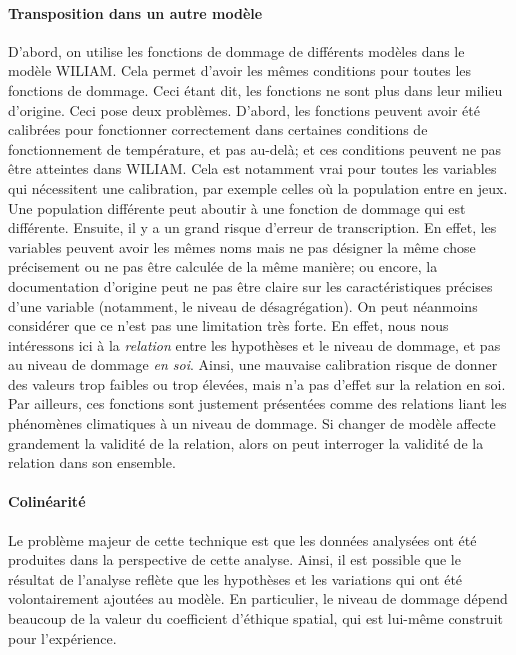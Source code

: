 \paragraph{Transposition dans un autre modèle} D'abord, on utilise les fonctions de dommage de différents modèles dans le modèle WILIAM. Cela permet d'avoir les mêmes conditions pour toutes les fonctions de dommage. Ceci étant dit, les fonctions ne sont plus dans leur milieu d'origine. Ceci pose deux problèmes. D'abord, les fonctions peuvent avoir été calibrées pour fonctionner correctement dans certaines conditions de fonctionnement de température, et pas au-delà; et ces conditions peuvent ne pas être atteintes dans WILIAM. Cela est notamment vrai pour toutes les variables qui nécessitent une calibration, par exemple celles où la population entre en jeux. Une population différente peut aboutir à une fonction de dommage qui est différente. Ensuite, il y a un grand risque d'erreur de transcription. En effet, les variables peuvent avoir les mêmes noms mais ne pas désigner la même chose précisement ou ne pas être calculée de la même manière; ou encore, la documentation d'origine peut ne pas être claire sur les caractéristiques précises d'une variable (notamment, le niveau de désagrégation). On peut néanmoins considérer que ce n'est pas une limitation très forte. En effet, nous nous intéressons ici à la \emph{relation} entre les hypothèses et le niveau de dommage, et pas au niveau de dommage \emph{en soi}. Ainsi, une mauvaise calibration risque de donner des valeurs trop faibles ou trop élevées, mais n'a pas d'effet sur la relation en soi. Par ailleurs, ces fonctions sont justement présentées comme des relations liant les phénomènes climatiques à un niveau de dommage. Si changer de modèle affecte grandement la validité de la relation, alors on peut interroger la validité de la relation dans son ensemble. 

\paragraph{Colinéarité} Le problème majeur de cette technique est que les données analysées ont été produites dans la perspective de cette analyse. Ainsi, il est possible que le résultat de l'analyse  reflète que les hypothèses et les variations qui ont été volontairement ajoutées au modèle. En particulier, le niveau de dommage dépend beaucoup de la valeur du coefficient d'éthique spatial, qui est lui-même construit pour l'expérience. 



